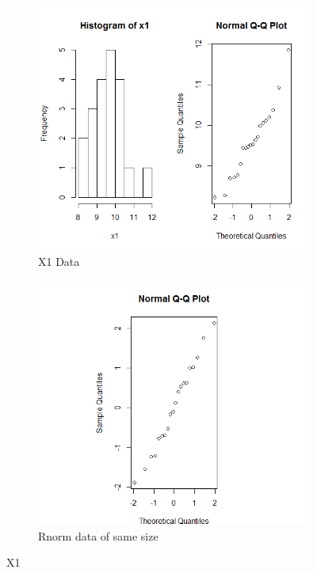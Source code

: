 \documentclass{article}
\begin{document}
    \begin{figure}
    \begin{subfigure}{.5\textwidth}
      \centering
      \includegraphics[width=.8\linewidth]{results/X1}
      \caption{X1 Data}
    \end{subfigure}
    \begin{subfigure}{.5\textwidth}
      \centering
      \includegraphics[width=.8\linewidth]{results/X1_2}
      \caption{Rnorm data of same size}
    \end{subfigure}
    \caption{X1}
    \label{fig:X1}
    \end{figure}
\end{document}
